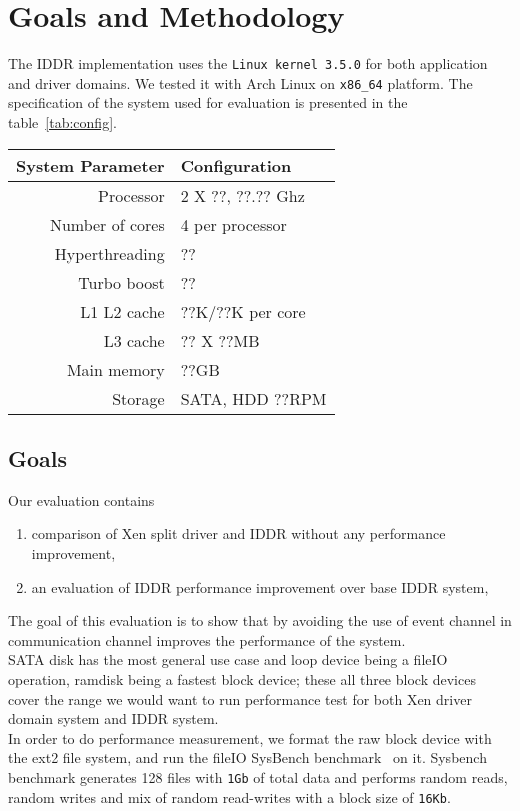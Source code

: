 \section{Goals and Methodology}
The IDDR implementation uses the \texttt{Linux kernel 3.5.0} for both application and driver domains. We tested it with Arch Linux on \texttt{x86\_64} platform. The specification of the system used for evaluation is presented in the table~\ref{tab:config}. 

\begin{center}
\begin{tabular}{|r|l|} 
  \hline
  \label{tab:config}
  System Parameter & Configuration \\
  \hline
  Processor & 2 X ??, ??.?? Ghz \\
  Number of cores & 4 per processor \\
  Hyperthreading & ?? \\
  Turbo boost & ?? \\
  L1 L2 cache & ??K/??K per core \\
  L3 cache & ?? X ??MB \\
  Main memory & ??GB \\
  Storage & SATA, HDD ??RPM \\
  \hline 
\end{tabular}
\end{center}
 
\subsection{Goals}
\label{sec:goals}
Our evaluation contains 
\begin{enumerate} 
\item comparison of Xen split driver and IDDR without any performance improvement, 
\item an evaluation of IDDR performance improvement over base IDDR system,
\end{enumerate}
The goal of this evaluation is to show that by avoiding the use of event channel in communication channel improves the performance of the system. 
\\[3mm]
SATA disk has the most general use case and loop device being a fileIO operation, ramdisk being a fastest block device; these all three block devices cover the range we would want to run performance test for both Xen driver domain system and IDDR system. 
\\[3mm]
In order to do performance measurement, we format the raw block device with the ext2 file system, and run the fileIO SysBench benchmark~\cite{sysbench} on it. Sysbench benchmark generates 128 files with \texttt{1Gb} of total data and performs random reads, random writes and mix of random read-writes with a block size of \texttt{16Kb}. 

